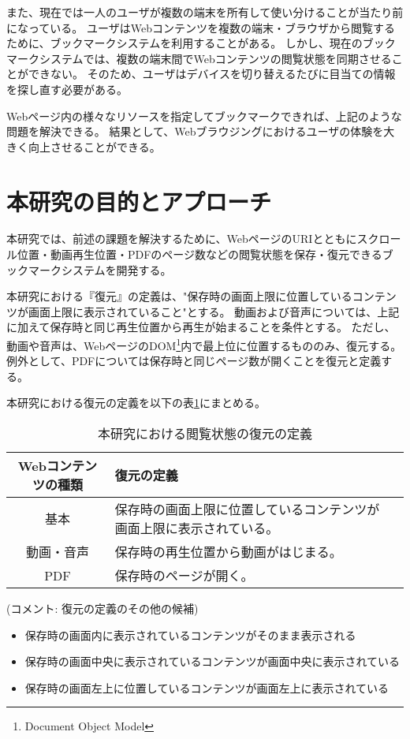また、現在では一人のユーザが複数の端末を所有して使い分けることが当たり前になっている。
ユーザはWebコンテンツを複数の端末・ブラウザから閲覧するために、ブックマークシステムを利用することがある。
しかし、現在のブックマークシステムでは、複数の端末間でWebコンテンツの閲覧状態を同期させることができない。
そのため、ユーザはデバイスを切り替えるたびに目当ての情報を探し直す必要がある。

Webページ内の様々なリソースを指定してブックマークできれば、上記のような問題を解決できる。
結果として、Webブラウジングにおけるユーザの体験を大きく向上させることができる。

\section{本研究の目的とアプローチ}
本研究では、前述の課題を解決するために、WebページのURIとともにスクロール位置・動画再生位置・PDFのページ数などの閲覧状態を保存・復元できるブックマークシステムを開発する。

本研究における『復元』の定義は、"保存時の画面上限に位置しているコンテンツが画面上限に表示されていること"とする。
動画および音声については、上記に加えて保存時と同じ再生位置から再生が始まることを条件とする。
ただし、動画や音声は、WebページのDOM\footnote{Document Object Model}内で最上位に位置するもののみ、復元する。
例外として、PDFについては保存時と同じページ数が開くことを復元と定義する。

本研究における復元の定義を以下の表\ref{tb:intro-restore-definition}にまとめる。

\begin{table}[htbp]
  \begin{center}
    \caption{本研究における閲覧状態の復元の定義}
    \label{tb:intro-restore-definition}
    \begin{tabular}{|c|l|l|}
      \hline
      Webコンテンツの種類 & 復元の定義 \\\hline\hline
      基本 & 保存時の画面上限に位置しているコンテンツが画面上限に表示されている。 \\\hline
      動画・音声 & 保存時の再生位置から動画がはじまる。 \\\hline
      PDF & 保存時のページが開く。 \\\hline
    \end{tabular}
  \end{center}
\end{table}

(コメント: 復元の定義のその他の候補)

\begin{itemize}
  \item 保存時の画面内に表示されているコンテンツがそのまま表示される
  \item 保存時の画面中央に表示されているコンテンツが画面中央に表示されている
  \item 保存時の画面左上に位置しているコンテンツが画面左上に表示されている
\end{itemize}


